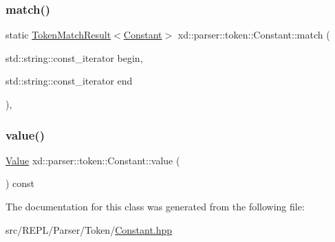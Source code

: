 \subsubsection{\texorpdfstring{match()}{match()}}
{\footnotesize\ttfamily static \mbox{\hyperlink{namespacexd_1_1parser_1_1token_a766c52bbfb7cb1f08498ef0bb9ec756e}{Token\+Match\+Result}}$<$\mbox{\hyperlink{classxd_1_1parser_1_1token_1_1_constant}{Constant}}$>$ xd\+::parser\+::token\+::\+Constant\+::match (\begin{DoxyParamCaption}\item[{std\+::string\+::const\+\_\+iterator}]{begin,  }\item[{std\+::string\+::const\+\_\+iterator}]{end }\end{DoxyParamCaption})\hspace{0.3cm}{\ttfamily [inline]}, {\ttfamily [static]}}

\mbox{\label{classxd_1_1parser_1_1token_1_1_constant_a09c7aa56d150130f89605eb95fa0057c}} 
\subsubsection{\texorpdfstring{value()}{value()}}
{\footnotesize\ttfamily \mbox{\hyperlink{classxd_1_1parser_1_1token_1_1_constant_a7ed9a004309ac798a76a11f67552616b}{Value}} xd\+::parser\+::token\+::\+Constant\+::value (\begin{DoxyParamCaption}{ }\end{DoxyParamCaption}) const\hspace{0.3cm}{\ttfamily [inline]}}



The documentation for this class was generated from the following file\+:\begin{DoxyCompactItemize}
\item 
src/\+R\+E\+P\+L/\+Parser/\+Token/\mbox{\hyperlink{_constant_8hpp}{Constant.\+hpp}}\end{DoxyCompactItemize}

